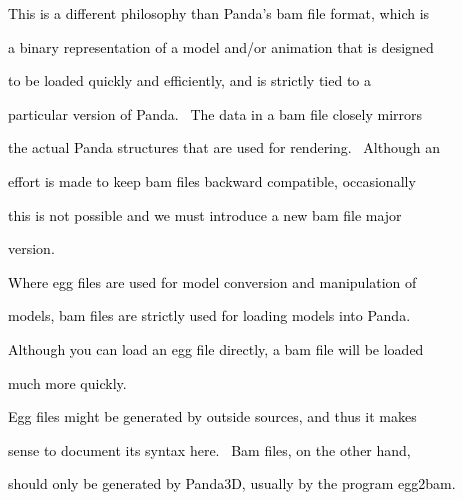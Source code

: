 \documentclass[a4paper]{article}
\newcommand\textstyleOOoComputerKeyWord[1]{\textrm{\textcolor[rgb]{0.0,0.0,0.5019608}{#1}}}
\begin{document}
{\color{black}
\textstyleOOoComputerKeyWord{\textcolor{black}{This is a different philosophy than Panda's bam file format, which is}}}

{\color{black}
\textstyleOOoComputerKeyWord{\textcolor{black}{a binary representation of a model and/or animation that is designed}}}

{\color{black}
\textstyleOOoComputerKeyWord{\textcolor{black}{to be loaded quickly and efficiently, and is strictly tied to a}}}

{\color{black}
\textstyleOOoComputerKeyWord{\textcolor{black}{particular version of Panda. \ The data in a bam file closely mirrors}}}

{\color{black}
\textstyleOOoComputerKeyWord{\textcolor{black}{the actual Panda structures that are used for rendering. \ Although an}}}

{\color{black}
\textstyleOOoComputerKeyWord{\textcolor{black}{effort is made to keep bam files backward compatible, occasionally}}}

{\color{black}
\textstyleOOoComputerKeyWord{\textcolor{black}{this is not possible and we must introduce a new bam file major}}}

{\color{black}
\textstyleOOoComputerKeyWord{\textcolor{black}{version.}}}


\bigskip

{\color{black}
\textstyleOOoComputerKeyWord{\textcolor{black}{Where egg files are used for model conversion and manipulation of}}}

{\color{black}
\textstyleOOoComputerKeyWord{\textcolor{black}{models, bam files are strictly used for loading models into Panda.}}}

{\color{black}
\textstyleOOoComputerKeyWord{\textcolor{black}{Although you can load an egg file directly, a bam file will be loaded}}}

{\color{black}
\textstyleOOoComputerKeyWord{\textcolor{black}{much more quickly.}}}


\bigskip

{\color{black}
\textstyleOOoComputerKeyWord{\textcolor{black}{Egg files might be generated by outside sources, and thus it makes}}}

{\color{black}
\textstyleOOoComputerKeyWord{\textcolor{black}{sense to document its syntax here. \ Bam files, on the other hand,}}}

\clearpage
\bigskip

{\color{black}
\textstyleOOoComputerKeyWord{\textcolor{black}{should only be generated by Panda3D, usually by the program egg2bam.}}}
\end{document}
